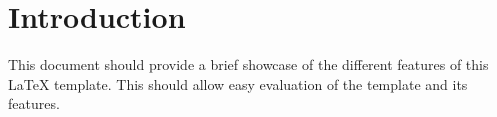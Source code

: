 %

\section{Introduction}

This document should provide a brief showcase of the different features of this
LaTeX template. This should allow easy evaluation of the template and its
features.
